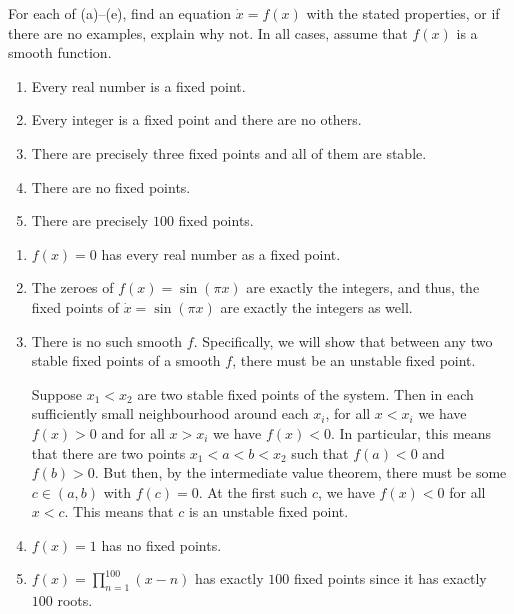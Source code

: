 \documentclass[12 pt, letterpaper]{hmcpset}
\begin{document}
\pagebreak

\begin{problem}[Strogatz 2.2.10]
	For each of (a)--(e), find an equation $\dot{x} = f(x)$ with the stated properties, or if there are no examples, explain why not. In all cases, assume that $f(x)$ is a smooth function.
	\begin{enumerate}
		\item Every real number is a fixed point.
		\item Every integer is a fixed point and there are no others.
		\item There are precisely three fixed points and all of them are stable.
		\item There are no fixed points.
		\item There are precisely $100$ fixed points.
	\end{enumerate}
\end{problem}

\begin{solution}
	\begin{enumerate}
		\item $f(x) = 0$ has every real number as a fixed point.

		\item The zeroes of $f(x) = \sin(\pi x)$ are exactly the integers, and thus, the fixed points of $\dot{x} = \sin{(\pi x)}$ are exactly the integers as well.

		\item There is no such smooth $f$. Specifically, we will show that between any two stable fixed points of a smooth $f$, there must be an unstable fixed point.

			Suppose $x_{1} < x_{2}$ are two stable fixed points of the system. Then in each sufficiently small neighbourhood around each $x_{i}$, for all $x < x_{i}$ we have $f(x) > 0$ and for all  $x > x_{i}$ we have $f(x) < 0$. In particular, this means that there are two points $x_{1} < a < b < x_{2}$ such that $f(a) < 0$ and $f(b) > 0$. But then, by the intermediate value theorem, there must be some $c \in (a, b)$ with $f(c) = 0$. At the first such $c$, we have $f(x) < 0$ for all $x < c$. This means that $c$ is an unstable fixed point.

		\item $f(x) = 1$ has no fixed points.

		\item  $f(x) = \prod_{n = 1}^{100} (x - n)$ has exactly $100$ fixed points since it has exactly $100$ roots.
	\end{enumerate}
\end{solution}
\end{document}

